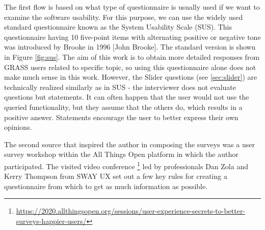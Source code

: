 \documentclass[a4paper,10pt,twoside]{article}
\begin{document}
The first flow is based on what type of questionnaire is usually used if we want to examine the software usability. For this purpose, we can use the widely used standard questionnaire known as the System Usability Scale (SUS). This questionnaire having 10 five-point items with alternating positive or negative tone was introduced by Brooke in 1996 [John Brooke]. The standard version is shown in Figure \ref{fig:sus}. The aim of this work is to obtain more detailed responses from GRASS users related to specific topic, so using this questionnaire alone does not make much sense in this work. However, the Slider questions (see \ref{sec:slider}) are technically realized similarly as in SUS - the interviewer does not evaluate questions but statements. It can often happen that the user would not use the queried functionality, but they assume that the others do, which results in a positive answer. Statements encourage the user to better express their own opinions.

The second source that inspired the author in composing the surveys was a user survey workshop within the All Things Open platform in which the author participated. The visited video conference \footnote{\url{https://2020.allthingsopen.org/sessions/user-experience-secrets-to-better-surveys-happier-users/}} led by professionals Dan Zola and Kerry Thompson from SWAY UX set out a few key rules for creating a questionnaire from which to get as much information as possible.
\end{document}
